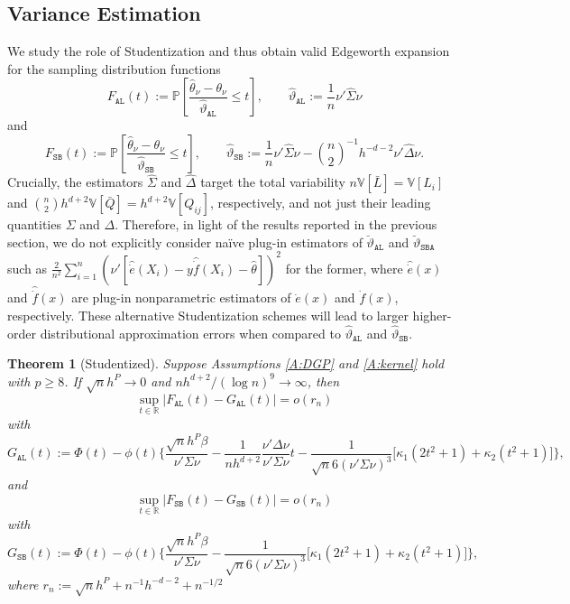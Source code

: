 \documentclass[11pt]{article}
\newtheorem{thm}{Theorem}
\numberwithin{equation}{section}
\theoremstyle{definition}
\renewcommand{\P}{\mathbb{P}}
\newcommand{\V}{\mathbb{V}}
\newcommand{\R}{\mathbb{R}}
\newcommand{\Scale}{\vartheta}
\begin{document}
\subsection{Variance Estimation}

We study the role of Studentization and thus obtain valid Edgeworth expansion for the sampling distribution functions
\begin{equation*}
    F_\mathtt{AL}(t) := \P\left[\frac{\widehat{\theta}_\nu - \theta_\nu}{\widehat{\Scale}_\mathtt{AL}}\leq t\right],\qquad
    \widehat{\Scale}_\mathtt{AL} := \frac{1}{n}\nu'\widehat{\Sigma}\nu
\end{equation*}
and
\begin{equation*}
    F_\mathtt{SB}(t) := \P\left[\frac{\widehat{\theta}_\nu - \theta_\nu}{\widehat{\Scale}_\mathtt{SB}}\leq t\right],\qquad
    \widehat{\Scale}_\mathtt{SB} := \frac{1}{n}\nu'\widehat{\Sigma}\nu - \binom{n}{2}^{-1}h^{-d-2}\nu'\widehat{\Delta}\nu.
\end{equation*}
Crucially, the estimators $\widehat{\Sigma}$ and $\widehat{\Delta}$ target the total variability $n\V[\bar{L}]=\V[L_i]$ and $\binom{n}{2}h^{d+2}\V[\bar{Q}]=h^{d+2}\V[Q_{ij}]$, respectively, and not just their leading quantities $\Sigma$ and $\Delta$. Therefore, in light of the results reported in the previous section, we do not explicitly consider na\"ive plug-in estimators of $\breve{\Scale}_\mathtt{AL}$ and $\breve{\Scale}_\mathtt{SBA}$ such as $\frac{2}{n^2} \sum_{i=1}^n (\nu'[\widehat{\dot{e}}(X_i) -y\widehat{\dot{f}}(X_i) - \widehat{\theta}])^2$ for the former, where $\widehat{\dot{e}}(x)$ and $\widehat{\dot{f}}(x)$ are plug-in nonparametric estimators of $\dot{e}(x)$ and $\dot{f}(x)$, respectively. These alternative Studentization schemes will lead to larger higher-order distributional approximation errors when compared to $\widehat{\Scale}_\mathtt{AL}$ and $\widehat{\Scale}_\mathtt{SB}$.

\begin{thm}[Studentized]\label{thm:EE-student}
    Suppose Assumptions \ref{A:DGP} and \ref{A:kernel} hold with $p\geq8$. If $\sqrt{n}h^P\to 0$ and $nh^{d+2}/(\log n)^9\to\infty$, then
    \[\sup_{t\in \R}\big|F_\mathtt{AL}(t)- G_\mathtt{AL}(t)\big| = o(r_n)\]
    with
    \[G_\mathtt{AL}(t) := \Phi(t) -\phi(t)\Big\{\frac{\sqrt{n}h^P\beta}{\nu'\Sigma\nu} - \frac{1}{nh^{d+2}} \frac{\nu'\Delta\nu}{\nu'\Sigma\nu} t - \frac{1}{\sqrt{n} 6(\nu'\Sigma\nu)^3}\Big[\kappa_1 (2t^2+1) + \kappa_2 (t^2+1)\Big]\Big\},\]
    and
    \[\sup_{t\in \R}\big|F_\mathtt{SB}(t)- G_\mathtt{SB}(t)\big| = o(r_n)\]
    with
    \[G_\mathtt{SB}(t) := \Phi(t) -\phi(t)\Big\{\frac{\sqrt{n}h^P\beta}{\nu'\Sigma\nu} - \frac{1}{\sqrt{n} 6(\nu'\Sigma\nu)^3}\Big[\kappa_1 (2t^2+1) + \kappa_2 (t^2+1)\Big]\Big\},\]
    where $r_n := \sqrt{n}h^{P} + n^{-1}h^{-d-2} + n^{-1/2}$
\end{thm}
\end{document}
